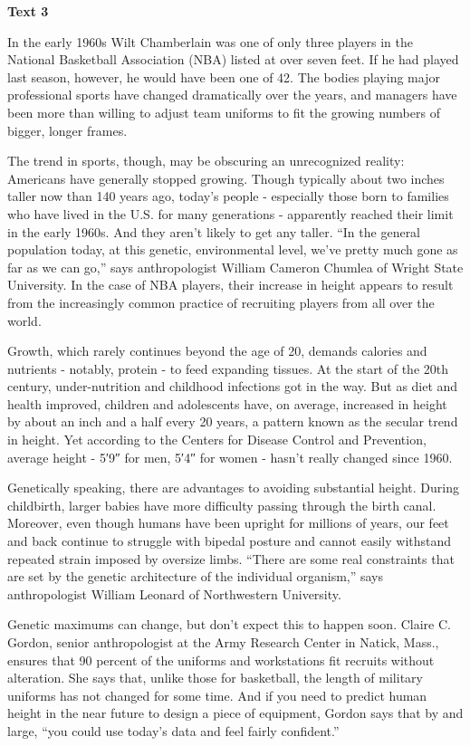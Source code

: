 \begin{center}\textbf{Text 3}\end{center}

\qquad In the early 1960s Wilt Chamberlain was one of only three players in the National Basketball Association (NBA) listed at over seven feet. If he had played last season, however, he would have been one of 42. The bodies playing major professional sports have changed dramatically over the years, and managers have been more than willing to adjust team uniforms to fit the growing numbers of bigger, longer frames.

\qquad The trend in sports, though, may be obscuring an unrecognized reality: Americans have generally stopped growing. Though typically about two inches taller now than 140 years ago, today’s people - especially those born to families who have lived in the U.S. for many generations - apparently reached their limit in the early 1960s. And they aren’t likely to get any taller. “In the general population today, at this genetic, environmental level, we’ve pretty much gone as far as we can go,” says anthropologist William Cameron Chumlea of Wright State University. In the case of NBA players, their increase in height appears to result from the increasingly common practice of recruiting players from all over the world.

\qquad Growth, which rarely continues beyond the age of 20, demands calories and nutrients - notably, protein - to feed expanding tissues. At the start of the 20th century, under-nutrition and childhood infections got in the way. But as diet and health improved, children and adolescents have, on average, increased in height by about an inch and a half every 20 years, a pattern known as the secular trend in height. Yet according to the Centers for Disease Control and Prevention, average height - 5′9″ for men, 5′4″ for women - hasn’t really changed since 1960.

\qquad Genetically speaking, there are advantages to avoiding substantial height. During childbirth, larger babies have more difficulty passing through the birth canal. Moreover, even though humans have been upright for millions of years, our feet and back continue to struggle with bipedal posture and cannot easily withstand repeated strain imposed by oversize limbs. “There are some real constraints that are set by the genetic architecture of the individual organism,” says anthropologist William Leonard of Northwestern University.

\qquad Genetic maximums can change, but don’t expect this to happen soon. Claire C. Gordon, senior anthropologist at the Army Research Center in Natick, Mass., ensures that 90 percent of the uniforms and workstations fit recruits without alteration. She says that, unlike those for basketball, the length of military uniforms has not changed for some time. And if you need to predict human height in the near future to design a piece of equipment, Gordon says that by and large, “you could use today’s data and feel fairly confident.”

